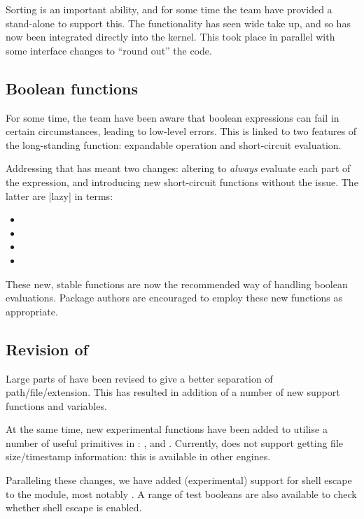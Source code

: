 \documentclass{ltnews}
\begin{document}
Sorting is an important ability, and for some time the team have provided a
stand-alone  to support this. The functionality has seen wide take
up, and so has now been integrated directly into the kernel. This took place in
parallel with some interface changes to \enquote{round out} the code.

\subsection{Boolean functions}

For some time, the team have been aware that boolean expressions can fail in
certain circumstances, leading to low-level errors. This is linked to two
features of the long-standing  function: expandable operation
and short-circuit evaluation.

Addressing that has meant two changes: altering  to
\emph{always} evaluate each part of the expression, and introducing new
short-circuit functions without the issue. The latter are |lazy| in 
terms:
\begin{itemize}
\item {}
\item {}
\item {}
\item {}
\end{itemize}
These new, stable functions are now the recommended way of handling boolean
evaluations. Package authors are encouraged to employ these new functions as
appropriate.

\subsection{Revision of }

Large parts of  have been revised to give a better separation of
path/file/extension. This has resulted in addition of a number of new support
functions and variables.

At the same time, new experimental functions have been added to utilise a
number of useful primitives in : ,
 and . Currently, 
does not support getting file size/timestamp information: this is available in
other engines.

Paralleling these changes, we have added (experimental) support for shell
escape to the  module, most notably . A range of
test booleans are also available to check whether shell escape is enabled.
\end{document}
